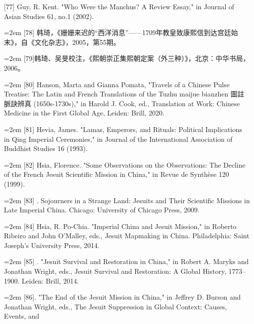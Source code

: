 [77] Guy, R. Kent. "Who Were the Manchus? A Review Essay," in Journal of Asian%
\space%
Studies 61, no.1 (2002).%
\par
\noindent\hangindent=2em
[78] 韩琦，《姗姗来迟的“西洋消息”——1709年教皇致康熙信到达宫廷始%
末》，自《文化杂志》，2005，第55期。%
\par
\noindent\hangindent=2em
[79]韩琦、吴旻校注，《熙朝崇正集熙朝定案（外三种）》，北京：中华书局，%
2006。%
\par
\noindent\hangindent=2em
[80] Hanson, Marta and Gianna Pomata, "Travels of a Chinese Pulse Treatise: The%
\space%
Latin and French Translations of the Tuzhu maijue bianzhen 圖註脈訣辨真%
(1650s-1730s)," in Harold J. Cook, ed., Translation at Work: Chinese Medicine in%
\space%
the First Global Age, Leiden: Brill, 2020.%
\par
\noindent\hangindent=2em
[81] Hevia, James. "Lamas, Emperors, and Rituals: Political Implications in Qing%
\space%
Imperial Ceremonies," in Journal of the International Association of Buddhist%
\space%
Studies 16 (1993).%
\par
\noindent\hangindent=2em
[82] Hsia, Florence. "Some Observations on the Observations: The Decline of the%
\space%
French Jesuit Scientific Mission in China," in Revue de Synthèse 120 (1999).%
\par
\noindent\hangindent=2em
[83] . Sojourners in a Strange Land: Jesuits and Their Scientific Missions in Late%
\space%
Imperial China. Chicago: University of Chicago Press, 2009.%
\par
\noindent\hangindent=2em
[84] Hsia, R. Po-Chia. "Imperial China and Jesuit Mission," in Roberto Ribeiro and%
\space%
John O'Malley, eds., Jesuit Mapmaking in China. Philadelphia: Saint Joseph's%
\space%
University Press, 2014.%
\par
\noindent\hangindent=2em
[85] . "Jesuit Survival and Restoration in China," in Robert A. Maryks and%
\space%
Jonathan Wright, eds., Jesuit Survival and Restoration: A Global History, 1773–%
1900. Leiden: Brill, 2014.%
\par
\noindent\hangindent=2em
[86]. "The End of the Jesuit Mission in China," in Jeffrey D. Burson and%
\space%
Jonathan Wright, eds., The Jesuit Suppression in Global Context: Causes, Events, and%
